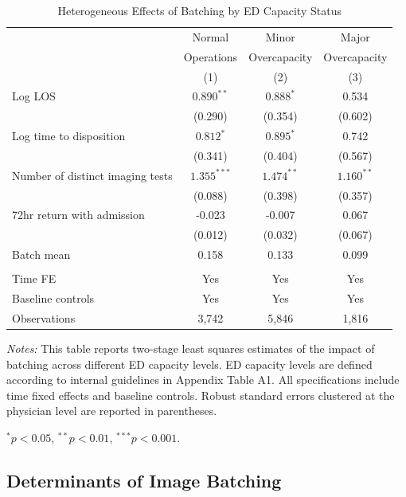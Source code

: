 \documentclass[,,nonblindrev]{informs}
\begin{document}
\begin{table}[t]
\centering
\caption{Heterogeneous Effects of Batching by ED Capacity Status}
\label{tab:het_effects}
\begin{threeparttable}
\begin{tabular}{lccc}
\toprule
& Normal & Minor & Major \\ 
& Operations & Overcapacity & Overcapacity \\ 
& (1) & (2) & (3) \\ 
\midrule
Log LOS & $0.890^{**}$ & $0.888^{*}$ & 0.534 \\ 
& (0.290) & (0.354) & (0.602) \\[0.5em] 
Log time to disposition & $0.812^{*}$ & $0.895^{*}$ & 0.742 \\ 
& (0.341) & (0.404) & (0.567) \\[0.5em] 
Number of distinct imaging tests & $1.355^{***}$ & $1.474^{**}$ & $1.160^{**}$ \\ 
& (0.088) & (0.398) & (0.357) \\[0.5em] 
72hr return with admission & -0.023 & -0.007 & 0.067 \\ 
& (0.012) & (0.032) & (0.067) \\[0.5em] 
\midrule
Batch mean & 0.158 & 0.133 & 0.099 \\[0.5em]
\\
Time FE & Yes & Yes & Yes \\ 
Baseline controls & Yes & Yes & Yes \\ 
Observations & 3,742 & 5,846 & 1,816 \\ 
\bottomrule
\end{tabular}
\begin{tablenotes}
\footnotesize
\item \textit{Notes:} This table reports two-stage least squares estimates of the impact of batching across different ED capacity levels. ED capacity levels are defined according to internal guidelines in Appendix Table A1. All specifications include time fixed effects and baseline controls. Robust standard errors clustered at the physician level are reported in parentheses. 
\item $^{*} p<0.05$, $^{**} p<0.01$, $^{***} p<0.001$.
\end{tablenotes}
\end{threeparttable}
\end{table}

\subsection{Determinants of Image
Batching}\label{determinants-of-image-batching}
\end{document}
